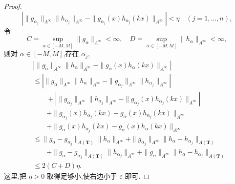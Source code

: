 \begin{proof}
\begin{equation*}
\left|\|g_{\alpha_{j}}\|_{A^{\infty}}\|h_{\alpha_{j}}\|_{A^{\infty}} - \|g_{\alpha_{j}}(x)h_{\alpha_{j}}(kx)\|_{A^{\infty}}\right| < \eta \quad (j = 1, \ldots, n),
\end{equation*}
令
\begin{equation*}
C = \sup_{\alpha \in [-M, M]}\|g_{\alpha}\|_{A^{\infty}} < \infty, \quad D = \sup_{\alpha \in [-M, M]}\|h_{\alpha}\|_{A^{\infty}} < \infty,
\end{equation*}
则对 $\alpha \in [-M, M]$,存在 $\alpha_{j}$,
\begin{align*}
& \left|\|g_{\alpha}\|_{A^{\infty}}\|h_{\alpha}\|_{A^{\infty}} - \|g_{\alpha}(x)h_{\alpha}(kx)\|_{A^{\infty}}\right| \\
& \leq \left|\|g_{\alpha}\|_{A^{\infty}}\|h_{\alpha}\|_{A^{\infty}} - \|g_{\alpha_{j}}\|_{A^{\infty}}\|h_{\alpha_{j}}\|_{A^{\infty}}\right| \\
& \qquad + \left|\|g_{\alpha_{j}}\|_{A^{\infty}}\|h_{\alpha_{j}}\|_{A^{\infty}} - \|g_{\alpha_{j}}(x)h_{\alpha_{j}}(kx)\|_{A^{\infty}}\right| \\
& \qquad + \|g_{\alpha_{j}}(x)h_{\alpha_{j}}(kx) - g_{\alpha}(x)h_{\alpha_{j}}(kx)\|_{A^{\infty}} \\
& \qquad + \|g_{\alpha}(x)h_{\alpha_{j}}(kx) - g_{\alpha}(x)h_{\alpha}(kx)\|_{A^{\infty}} \\
& \leq \|g_{\alpha} - g_{\alpha_{j}}\|_{A(\mathbf{T})}\|h_{\alpha}\|_{A^{\infty}} + \|g_{\alpha_{j}}\|_{A^{\infty}}\|h_{\alpha} - h_{\alpha_{j}}\|_{A(\mathbf{T})} \\
& \qquad + \|g_{\alpha} - g_{\alpha_{j}}\|_{A(\mathbf{T})}\|h_{\alpha_{j}}\|_{A^{\infty}} + \|g_{\alpha}\|_{A^{\infty}}\|h_{\alpha} - h_{\alpha_{j}}\|_{A(\mathbf{T})} \\
& \leq 2(C + D)\eta.
\end{align*}
这里,把 $\eta > 0$ 取得足够小,使右边小于 $\varepsilon$ 即可.


\end{proof}
